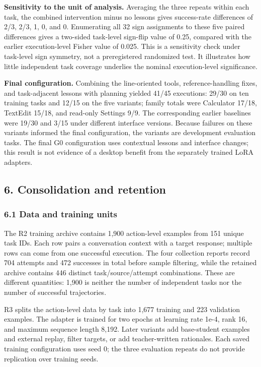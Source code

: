 \documentclass[
  10pt,
]{article}
\begin{document}
\textbf{Sensitivity to the unit of analysis.} Averaging the three
repeats within each task, the combined intervention minus no lessons
gives success-rate differences of 2/3, 2/3, 1, 0, and 0. Enumerating all
32 sign assignments to these five paired differences gives a two-sided
task-level sign-flip value of 0.25, compared with the earlier
execution-level Fisher value of 0.025. This is a sensitivity check under
task-level sign symmetry, not a preregistered randomized test. It
illustrates how little independent task coverage underlies the nominal
execution-level significance.

\textbf{Final configuration.} Combining the line-oriented tools,
reference-handling fixes, and task-adjacent lessons with planning
yielded 41/45 executions: 29/30 on ten training tasks and 12/15 on the
five variants; family totals were Calculator 17/18, TextEdit 15/18, and
read-only Settings 9/9. The corresponding earlier baselines were 19/30
and 3/15 under different interface versions. Because failures on these
variants informed the final configuration, the variants are development
evaluation tasks. The final G0 configuration uses contextual lessons and
interface changes; this result is not evidence of a desktop benefit from
the separately trained LoRA adapters.

\subsection{6. Consolidation and
retention}\label{consolidation-and-retention}

\subsubsection{6.1 Data and training
units}\label{data-and-training-units}

The R2 training archive contains 1,900 action-level examples from 151
unique task IDs. Each row pairs a conversation context with a target
response; multiple rows can come from one successful execution. The four
collection reports record 704 attempts and 472 successes in total before
sample filtering, while the retained archive contains 446 distinct
task/source/attempt combinations. These are different quantities: 1,900
is neither the number of independent tasks nor the number of successful
trajectories.

R3 splits the action-level data by task into 1,677 training and 223
validation examples. The adapter is trained for two epochs at learning
rate 1e-4, rank 16, and maximum sequence length 8,192. Later variants
add base-student examples and external replay, filter targets, or add
teacher-written rationales. Each saved training configuration uses seed
0; the three evaluation repeats do not provide replication over training
seeds.
\end{document}
